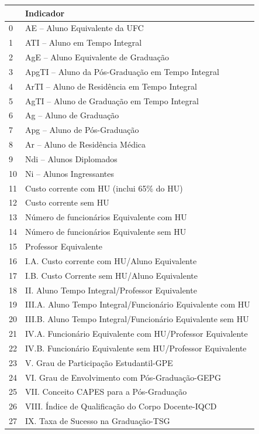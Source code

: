 \documentclass{report}
\begin{document}
\begin{tabular}{ll}
\toprule
{} &                                                   Indicador \\
\midrule
0  &  AE – Aluno Equivalente da UFC \\
1  &  ATI – Aluno em Tempo Integral \\
2  &  AgE – Aluno Equivalente de Graduação \\
3  &  ApgTI – Aluno da Pós-Graduação em Tempo Integral \\
4  &  ArTI – Aluno de Residência em Tempo Integral \\
5  &  AgTI – Aluno de Graduação em Tempo Integral \\
6  &  Ag – Aluno de Graduação \\
7  &  Apg – Aluno de Pós-Graduação \\
8  &  Ar – Aluno de Residência Médica \\
9  &  Ndi – Alunos Diplomados \\
10 &  Ni – Alunos Ingressantes \\
11 &  Custo corrente com HU (inclui 65\% do HU) \\
12 &  Custo corrente sem HU \\
13 &  Número de funcionários Equivalente com HU \\
14 &  Número de funcionários Equivalente sem HU \\
15 &  Professor Equivalente \\
16 &  I.A. Custo corrente com HU/Aluno Equivalente \\
17 &  I.B. Custo Corrente sem HU/Aluno Equivalente \\
18 &  II. Aluno Tempo Integral/Professor Equivalente \\
19 &  III.A. Aluno Tempo Integral/Funcionário Equivalente com HU \\
20 &  III.B. Aluno Tempo Integral/Funcionário Equivalente sem HU \\
21 &  IV.A. Funcionário Equivalente com HU/Professor Equivalente \\
22 &  IV.B. Funcionário Equivalente sem HU/Professor Equivalente \\
23 &  V. Grau de Participação Estudantil-GPE \\
24 &  VI. Grau de Envolvimento com Pós-Graduação-GEPG \\
25 &  VII. Conceito CAPES para a Pós-Graduação \\
26 &  VIII. Índice de Qualificação do Corpo Docente-IQCD \\
27 &  IX. Taxa de Sucesso na Graduação-TSG \\
\bottomrule
\end{tabular}
\end{document}

